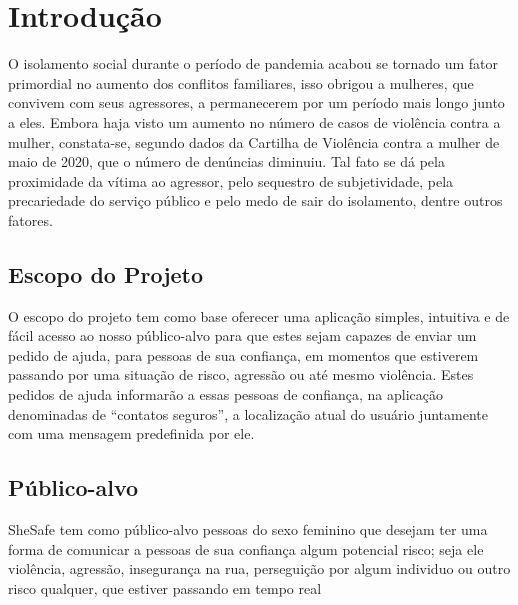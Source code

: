 \documentclass[
	12pt,				    %
	openright,			    %
	oneside,			    %
	a4paper,			    %
    sumario=tradicional,    %
	english,			    %
	brazil,				    %
	]{abntex2}              %
\begin{document}
\textual


\chapter{Introdução}\label{sec:introducao}
O isolamento social durante o período de pandemia acabou se tornado um fator primordial no aumento dos conflitos familiares, isso obrigou a mulheres, que convivem com seus agressores, a permanecerem por um período mais longo junto a eles. Embora haja visto um aumento no número de casos de violência contra a mulher, constata-se, segundo dados da Cartilha de Violência contra a mulher de maio de 2020, que o número de denúncias diminuiu. Tal fato se dá pela proximidade da vítima ao agressor, pelo sequestro de subjetividade, pela precariedade do serviço público e pelo medo de sair do isolamento, dentre outros fatores.

\section{Escopo do Projeto}
O escopo do projeto tem como base oferecer uma aplicação simples, intuitiva e de fácil acesso ao nosso público-alvo para que estes sejam capazes de enviar um pedido de ajuda, para pessoas de sua confiança, em momentos que estiverem passando por uma situação de risco, agressão ou até mesmo violência. Estes pedidos de ajuda informarão a essas pessoas de confiança, na aplicação denominadas de “contatos seguros”, a localização atual do usuário juntamente com uma mensagem predefinida por ele.

\section{Público-alvo}
SheSafe tem como público-alvo pessoas do sexo feminino que desejam ter uma forma de comunicar a pessoas de sua confiança algum potencial risco; seja ele violência, agressão, insegurança na rua, perseguição por algum individuo ou outro risco qualquer, que estiver passando em tempo real
\end{document}
